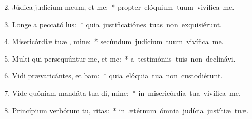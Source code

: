 \begin{flushleft}
\begin{enumerate}[leftmargin=*]
\setcounter{enumi}{1}

\item Júdica judícium meum, et  me:~* \mbox{propter elóquium tuum vivífica me.}
\item Longe a peccató lus:~* \mbox{quia justificatiónes tuas non exquisiérunt.}
\item Misericórdiæ tuæ , mine:~* \mbox{secúndum judícium tuum vivífica me.}
\item Multi qui persequúntur me, et  me:~* \mbox{a testimóniis tuis non declinávi.}
\item Vidi prævaricántes, et bam:~* \mbox{quia elóquia tua non custodiérunt.}
\item Vide quóniam mandáta tua di, mine:~* \mbox{in misericórdia tua vivífica me.}
\item Princípium verbórum tu, ritas:~* \mbox{in ætérnum ómnia judícia justítiæ tuæ.}


\end{enumerate}
\end{flushleft}

